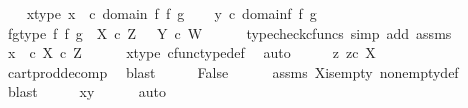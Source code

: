 \begin{isabellebody}
\ \ \isamarkupfalse%
\ x{\isacharunderscore}{\kern0pt}type{\isacharcolon}{\kern0pt}\ {\isachardoublequoteopen}x\ \ {\isasymin}\isactrlsub c\ domain\ {\isacharparenleft}{\kern0pt}f\ {\isasymtimes}\isactrlsub f\ g{\isacharparenright}{\kern0pt}{\isachardoublequoteclose}\isanewline
\ \ \isamarkupfalse%
\ {\isachardoublequoteopen}y\ {\isasymin}\isactrlsub c\ domain{\isacharparenleft}{\kern0pt}f\ {\isasymtimes}\isactrlsub f\ g{\isacharparenright}{\kern0pt}{\isachardoublequoteclose}\isanewline
\ \ \isamarkupfalse%
\ fg{\isacharunderscore}{\kern0pt}type{\isacharcolon}{\kern0pt}\ {\isachardoublequoteopen}f\ {\isasymtimes}\isactrlsub f\ g\ {\isacharcolon}{\kern0pt}\ X\ {\isasymtimes}\isactrlsub c\ Z\ \ {\isasymrightarrow}\ Y\ {\isasymtimes}\isactrlsub c\ W{\isachardoublequoteclose}\isanewline
\ \ \ \ \isamarkupfalse%
\ {\isacharparenleft}{\kern0pt}typecheck{\isacharunderscore}{\kern0pt}cfuncs{\isacharcomma}{\kern0pt}\ simp\ add{\isacharcolon}{\kern0pt}\ assms{\isacharparenleft}{\kern0pt}{}{\isacharcomma}{\kern0pt}{}{\isacharparenright}{\kern0pt}{\isacharparenright}{\kern0pt}\isanewline
\ \ \isamarkupfalse%
\ \isamarkupfalse%
\ {\isachardoublequoteopen}x\ \ {\isasymin}\isactrlsub c\ X\ {\isasymtimes}\isactrlsub c\ Z{\isachardoublequoteclose}\isanewline
\ \ \ \ \isamarkupfalse%
\ x{\isacharunderscore}{\kern0pt}type\ cfunc{\isacharunderscore}{\kern0pt}type{\isacharunderscore}{\kern0pt}def\ \isamarkupfalse%
\ auto\isanewline
\ \ \isamarkupfalse%
\ \isamarkupfalse%
\ {\isachardoublequoteopen}{\isasymexists}z{\isachardot}{\kern0pt}\ z{\isasymin}\isactrlsub c\ X{\isachardoublequoteclose}\isanewline
\ \ \ \ \isamarkupfalse%
\ cart{\isacharunderscore}{\kern0pt}prod{\isacharunderscore}{\kern0pt}decomp\ \isamarkupfalse%
\ blast\isanewline
\ \ \isamarkupfalse%
\ \isamarkupfalse%
\ False\isanewline
\ \ \ \ \isamarkupfalse%
\ assms{\isacharparenleft}{\kern0pt}{}{\isacharparenright}{\kern0pt}\ X{\isacharunderscore}{\kern0pt}is{\isacharunderscore}{\kern0pt}empty\ nonempty{\isacharunderscore}{\kern0pt}def\ \isamarkupfalse%
\ blast\isanewline
\ \ \isamarkupfalse%
\ \isamarkupfalse%
\ {\isachardoublequoteopen}x{\isacharequal}{\kern0pt}y{\isachardoublequoteclose}\isanewline
\ \ \ \ \isamarkupfalse%
\ auto\isanewline
{}\isamarkupfalse%

\end{isabellebody}
